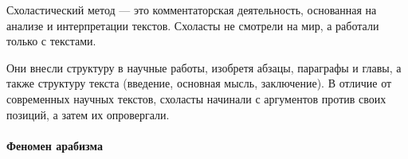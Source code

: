 
Схоластический метод — это комментаторская деятельность, основанная на анализе и интерпретации текстов. Схоласты не смотрели на мир, а работали только с текстами. 

Они внесли структуру в научные работы, изобретя абзацы, параграфы и главы, а также структуру текста (введение, основная мысль, заключение). В отличие от современных научных текстов, схоласты начинали с аргументов против своих позиций, а затем их опровергали.


\paragraph{Феномен арабизма}

